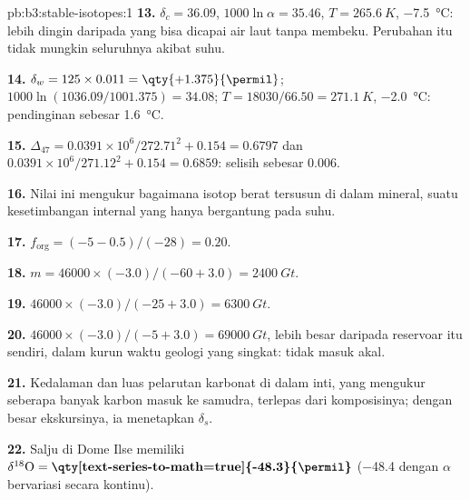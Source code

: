 \begin{solution}{pb:b3:stable-isotopes:1}
\textbf{13.} $\delta_c = 36.09$, $1000\ln\alpha = 35.46$, $T = \qty{265.6}{K}$,
\qty{-7.5}{\celsius}: lebih dingin daripada yang bisa dicapai air laut tanpa membeku. Perubahan itu
tidak mungkin seluruhnya akibat suhu.

\textbf{14.} $\delta_w = 125\times0.011 = \qty{+1.375}{\permil}$; $1000\ln(1036.09/1001.375)
= 34.08$; $T = 18030/66.50 = \qty{271.1}{K}$, \qty{-2.0}{\celsius}: pendinginan sebesar
\qty{1.6}{\celsius}.

\textbf{15.} $\Delta_{47} = 0.0391\times10^6/272.71^2 + 0.154 = 0.6797$ dan
$0.0391\times10^6/271.12^2 + 0.154 = 0.6859$: selisih sebesar
\qty{0.006}{\permil}.

\textbf{16.} Nilai ini mengukur bagaimana isotop berat tersusun di dalam
mineral, suatu kesetimbangan internal yang hanya bergantung pada suhu.

\textbf{17.} $f_{\mathrm{org}} = (-5 - 0.5)/(-28) = 0.20$.

\textbf{18.} $m = 46000\times(-3.0)/(-60 + 3.0) = \qty{2400}{Gt}$.

\textbf{19.} $46000\times(-3.0)/(-25 + 3.0) = \qty{6300}{Gt}$.

\textbf{20.} $46000\times(-3.0)/(-5 + 3.0) = \qty{69000}{Gt}$, lebih besar daripada
reservoar itu sendiri, dalam kurun waktu geologi yang singkat: tidak masuk akal.

\textbf{21.} Kedalaman dan luas pelarutan karbonat di dalam inti, yang
mengukur seberapa banyak karbon masuk ke samudra, terlepas dari komposisinya;
dengan besar ekskursinya, ia menetapkan $\delta_s$.

\textbf{22.} Salju di Dome Ilse memiliki $\delta^{18}\mathrm O =
\textbf{\qty[text-series-to-math=true]{-48.3}{\permil}}$ (\qty{-48.4}{\permil}
dengan $\alpha$ bervariasi secara kontinu).
\end{solution}
